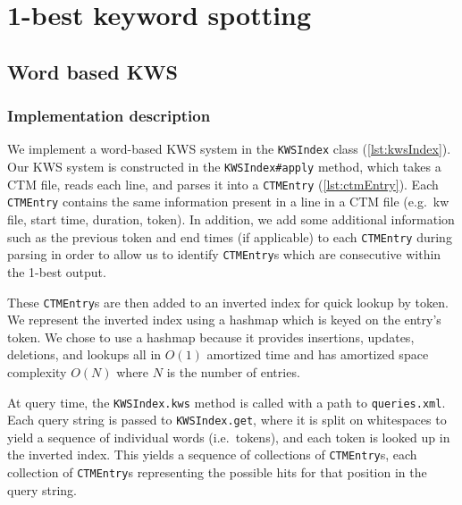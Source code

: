 \documentclass[a4paper,oneside,reqno]{amsart}
\begin{document}

\section{1-best keyword spotting}

\subsection{Word based KWS}

\subsubsection{Implementation description}\label{sec:word-kws-impl}

We implement a word-based KWS system in the \texttt{KWSIndex} class
(\autoref{lst:kwsIndex}).  Our KWS system is constructed in the
\texttt{KWSIndex\#apply} method, which takes a CTM file, reads each line, and
parses it into a \texttt{CTMEntry} (\autoref{lst:ctmEntry}).  Each
\texttt{CTMEntry} contains the same information present in a line in a CTM file
(e.g.\ kw file, start time, duration, token). In addition, we add some
additional information such as the previous token and end times (if applicable)
to each \texttt{CTMEntry} during parsing in order to allow us to identify
\texttt{CTMEntry}s which are consecutive within the 1-best output.

These \texttt{CTMEntry}s are then added to an inverted index for quick lookup
by token. We represent the inverted index using a hashmap which is keyed on the
entry's token.  We chose to use a hashmap because it provides insertions,
updates, deletions, and lookups all in $O(1)$ amortized time and has amortized
space complexity $O(N)$ where $N$ is the number of entries.

At query time, the \texttt{KWSIndex.kws} method is called with a path
to \texttt{queries.xml}. Each query string is passed to \texttt{KWSIndex.get},
where it is split on whitespaces to yield a sequence of individual words (i.e.\ tokens),
and each token is looked up in the inverted index. This yields a sequence of collections
of \texttt{CTMEntry}s, each collection of \texttt{CTMEntry}s representing the possible
hits for that position in the query string.
\end{document}
